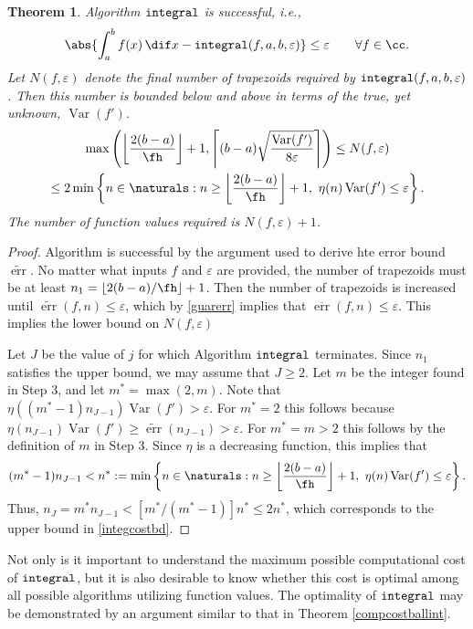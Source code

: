 \documentclass[]{article}
\DeclareMathOperator{\integ}{\texttt{\textup{integral}}}
\DeclareMathOperator{\Var}{Var}
\DeclareMathOperator{\err}{err}
\newcommand{\oerr}{\overline{\err}}
\newcommand{\terr}{\widetilde{\err}}
\newtheorem{theorem}{Theorem}
\theoremstyle{definition}
\theoremstyle{remark}
\newcommand{\hcut}{\fh}
\begin{document}
\begin{theorem} \label{conealgothm}
Algorithm $\integ$ is successful, i.e.,  
\[
\abs{\int_a^b f(x) \, \dif x - \integ(f,a,b,\varepsilon)} \le \varepsilon \qquad \forall f \in \cc.
\]
Let $N(f,\varepsilon)$ denote the final number of trapezoids required by $\integ(f,a,b,\varepsilon)$.  Then this number is bounded below and above in terms of the true, yet unknown, $\Var(f')$.
\begin{multline} \label{integcostbd}
\max\left(\left \lfloor \frac{2(b-a)}{\hcut} \right \rfloor +1, \left \lceil (b-a) \sqrt{\frac{\Var(f')}{8\varepsilon}} \right \rceil \right) \le
N(f,\varepsilon) \\
\le  2 \min \left \{ n \in \naturals : n\ge \left \lfloor \frac{2(b-a)}{\hcut} \right \rfloor +1,  \ \eta(n)  \Var(f') \le  \varepsilon \right \} .
\end{multline}
The number of function values required is $N(f,\varepsilon)+1$.
\end{theorem}

\begin{proof} Algorithm is successful by the argument used to derive hte error bound $\terr$.  No matter what inputs $f$ and $\varepsilon$ are provided, the number of trapezoids must be at least $n_1 = \left \lfloor 2(b-a)/\hcut \right \rfloor +1$.  Then the number of trapezoids is increased until $\terr(f,n) \le \varepsilon$, which by \eqref{guarerr} implies that $\oerr(f,n) \le \varepsilon$.  This implies the lower bound on $N(f,\varepsilon)$ 

Let $J$ be the value of $j$ for which Algorithm $\integ$ terminates.  Since $n_1$ satisfies the upper bound, we may assume that $J \ge 2$.  Let $m$ be the integer found in Step 3, and let $m^*=\max(2,m)$.  Note that $\eta((m^*-1)n_{J-1}) \Var(f')  > \varepsilon$.  For $m^*=2$ this follows because $\eta(n_{J-1}) \Var(f') \ge \terr(n_{J-1}) > \varepsilon$.  For $m^*=m>2$ this follows by the definition of $m$ in Step 3.  Since $\eta$ is a decreasing function, this implies that 
\[
(m^*-1)n_{J-1} < n^*:= \min \left \{ n \in \naturals : n\ge \left \lfloor \frac{2(b-a)}{\hcut} \right \rfloor +1,  \ \eta(n)  \Var(f') \le  \varepsilon \right \}.
\]
Thus, $n_J=m^* n_{J-1} < [m^*/(m^*-1)] n^* \le 2 n^*$, which corresponds to the upper bound  in \eqref{integcostbd}.
\end{proof}

Not only is it important to understand the maximum possible computational cost of $\integ$, but it is also desirable to know whether this cost is optimal among all possible algorithms utilizing function values.  The optimality of $\integ$ may be demonstrated by an argument similar to that in Theorem \ref{compcostballint}.
\end{document}
